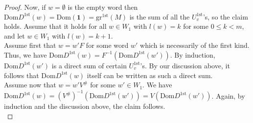 \documentclass[10pt,a4paper]{amsart}
\begin{document}
\begin{proof}
    Now, if $w = \emptyset$ is the empty word then $\mathrm{Dom}D^{1\mathrm{st}}(w) = \mathrm{Dom}(\mathbf 1) = \mathrm{gr}^{1\mathrm{st}}(M)$ is the sum of all the $U^{1\mathrm{st}}_v$'s, so the claim holds. Assume that it holds for all $w \in W_1$ with $l(w) = k$ for some $0 \leq k < m$, and let $w \in W_1$ with $l(w) = k+1$.\\
    Assume first that $w = w'F$ for some word $w'$ which is necessarily of the first kind. Thus, we have $\mathrm{Dom}D^{1\mathrm{st}}(w) = F^{-1}(\mathrm{Dom}D^{1\mathrm{st}}(w'))$. By induction, $\mathrm{Dom}D^{1\mathrm{st}}(w')$ is a direct sum of certain $U^{1\mathrm{st}}_v$'s. By our discussion above, it follows that $\mathrm{Dom}D^{1\mathrm{st}}(w)$ itself can be written as such a direct sum.\\
    \sloppy Assume now that $w = w'V^{\#}$ for some $w' \in W_1$. We have $\mathrm{Dom}D^{1\mathrm{st}}(w) = (V^{\#})^{-1}(\mathrm{Dom}D^{1\mathrm{st}}(w')) = V(\mathrm{Dom}D^{1\mathrm{st}}(w'))$. Again, by induction and the discussion above, the claim follows.\\


\end{proof}
\end{document}
